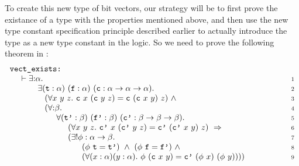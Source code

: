 To create this new type of bit vectors, our strategy will be to first prove the
existance of a type with the properties mentioned above, and then use the
new type constant specification principle described earlier
to actually introduce the type as a new type constant in the logic.
So we need to prove the following theorem in \HOLW{}:
\[
\begin{array}[t]{l@{\hspace{5mm}}l@{\hspace{20mm}}r}
\multicolumn{3}{l}{
\mbox{\tt vect\_exists:}} \\
& \vdash
 \exists{:}\alpha. &
\mbox{\scriptsize \textsc{1}} \\
 & \hspace{7mm}
   \exists(\mbox{\tt t}:\alpha)\ (\mbox{\tt f}:\alpha)\ 
          (\mbox{\tt c}:\alpha \rightarrow \alpha \rightarrow \alpha). &
\mbox{\scriptsize \textsc{2}} \\
 & \hspace{10mm}
   (\forall x\ y\ z.\ \mbox{\tt c}\ x\ (\mbox{\tt c}\ y\ z) =
                      \mbox{\tt c}\ (\mbox{\tt c}\ x\ y)\ z) \ \wedge &
\mbox{\scriptsize \textsc{3}} \\
 & \hspace{10mm}
   (\forall{:} \beta. &
\mbox{\scriptsize \textsc{4}} \\
 & \hspace{15mm}
    \forall (\mbox{\tt t'}:\beta)\ (\mbox{\tt f'}:\beta)\ 
            (\mbox{\tt c'}:\beta \rightarrow \beta \rightarrow \beta). &
\mbox{\scriptsize \textsc{5}} \\
 & \hspace{20mm}
   (\forall x\ y\ z.\ \mbox{\tt c'}\ x\ (\mbox{\tt c'}\ y\ z) =
                      \mbox{\tt c'}\ (\mbox{\tt c'}\ x\ y)\ z) \ \Rightarrow &
\mbox{\scriptsize \textsc{6}} \\
 & \hspace{20mm}
   (\exists ! \phi : \alpha \rightarrow \beta. &
\mbox{\scriptsize \textsc{7}} \\
 & \hspace{26mm}
   (\phi\ \mbox{\tt t} = \mbox{\tt t'}) \ \wedge \ 
   (\phi\ \mbox{\tt f} = \mbox{\tt f'}) \ \wedge &
\mbox{\scriptsize \textsc{8}} \\
 & \hspace{26mm}
   (\forall (x:\alpha) (y:\alpha).\ \phi\ (\mbox{\tt c}\ x\ y) =
                                    \mbox{\tt c'}\ (\phi\ x)\ (\phi\ y)))) &
\mbox{\scriptsize \textsc{9}} 
\end{array}
\]

